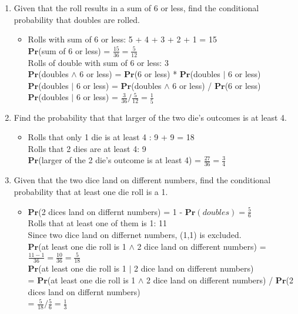 \documentclass[11pt]{article}
\renewcommand{\Pr}{\ensuremath{\mathbf{Pr}}\xspace}
\begin{document}
\begin{description}
\begin{enumerate}
\begin{enumerate}
 \item
Given that the roll results in a sum of 6 or less, find the conditional probability that doubles are rolled.
	\begin{itemize}
	\item
	Rolls with sum of 6 or less: 5 + 4 + 3 + 2 + 1 = 15 \\
	$\Pr$(sum of 6 or less) = $\frac{15}{36} = \frac{5}{12}$ \\
	Rolls of double with sum of 6 or less: 3 \\
	$\Pr$(doubles $\wedge$ 6 or less) = $\Pr$(6 or less) * $\Pr$(doubles $|$ 6 or less) \\
	$\Pr$(doubles $|$ 6 or less) = $\Pr$(doubles $\wedge$ 6 or less) / $\Pr$(6 or less) \\
	$\Pr$(doubles $|$ 6 or less) = $\frac{3}{36} / \frac{5}{12} = \frac{1}{5}$ \\
	\end{itemize}	
 \item
Find the probability that that larger of the two die's outcomes is at least 4.
	\begin{itemize}
	\item
	Rolls that only 1 die is at least 4 : 9 + 9 = 18 \\
	Rolls that 2 dies are at least 4: 9 \\
	$\Pr$(larger of the 2 die's outcome is at least 4) =  $\frac{27}{36} = \frac{3}{4}$
	\end{itemize}
 \item
Given that the two dice land on different numbers, find the conditional probability that at least one die roll is a 1.
	\begin{itemize}
	\item
	$\Pr$(2 dices land on differnt numbers) = 1 - $\Pr(doubles) = \frac{5}{6}$ \\
	Rolls that at least one of them is 1: 11 \\
	Since two dice land on differnet numbers, (1,1) is excluded. \\
	$\Pr$(at least one die roll is 1 $\wedge$ 2 dice land on different numbers) = $\frac{11 - 1}{36} = \frac{10}{36} = \frac{5}{18}$ \\
	$\Pr$(at least one die roll is 1 $|$ 2 dice land on different numbers) \\
	= $\Pr$(at least one die roll is 1 $\wedge$ 2 dice land on different numbers) / $\Pr$(2 dices land on differnt numbers) \\
	= $\frac{5}{18} / \frac{5}{6} = \frac{1}{3}$
	\end{itemize}

\end{enumerate}
\end{enumerate}
\end{description}
\end{document}
